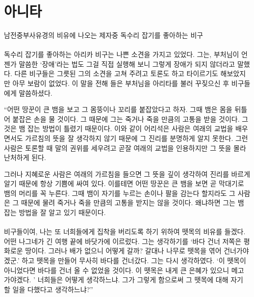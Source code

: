 \documentclass[12pt, a4paper, oneside]{book}
\let\stdsection\section
\renewcommand\section{\newpage\stdsection}
\begin{document}
	\section{ 아니타 }

\paragraph{}
남전중부사유경의 비유에 나오는 제자중 독수리 잡기를 좋아하는 비구

\paragraph{}
독수리 잡기를 좋아하는 아리카 비구는 나쁜 소견을 가지고 있었다.
그는, 부처님이 언젠가 말씀한 ‘장애’라는 법도 그걸 직접 실행해 보니 그렇게 장애가 되지 않더라고 말했다.
다른 비구들은 그릇된 그의 소견을 고쳐 주려고 토론도 하고 타이르기도 해보았지만 아무 보람이 없었다.
이 말을 전해 들은 부처님을 아리타를 불러 꾸짖으신 후 비구들에게 말씀하셨다.

“어떤 땅꾼이 큰 뱀을 보고 그 몸뚱이나 꼬리를 붙잡았다고 하자.
그때 뱀은 몸을 뒤틀어 붙잡은 손을 물 것이다.
그 때문에 그는 죽거나 죽을 만큼의 고통을 받을 것이다.
그것은 뱀 잡는 방법이 틀렸기 때문이다.
이와 같이 어리석은 사람은 여래의 교법을 배우면서도
가르침의 뜻을 잘 생각하지 않기 때문에 그 진리를 분명하게 알지 못한다.
그런 사람은 토론할 때 말의 권위를 세우려고
곧잘 여래의 교법을 인용하지만 그 뜻을 몰라 난처하게 된다.

그러나 지혜로운 사람은 여래의 가르침을 들으면
그 뜻을 깊이 생각하여 진리를 바르게 알기 때문에 항상 기쁨에 싸여 있다.
이를테면 어떤 땅꾼은 큰 뱀을 보면 곧 막대기로 뱀의 머리를 꼭 누른다.
그때 뱀이 자기를 누르는 손이나 팔을 감는다 할지라도
그 사람은 그 때문에 물려 죽거나
죽을 만큼의 고통을 받지는 않을 것이다.
왜냐하면 그는 뱀 잡는 방법을 잘 알고 있기 때문이다. 

\paragraph{}
비구들이여,
나는 또 너희들에게 집착을 버리도록 하기 위하여 뗏목의 비유를 들겠다.
어떤 나그네가 긴 여행 끝에 바닷가에 이르렀다.
그는 생각하기를 ‘바다 건너 저쪽은 평화로운 땅이다.
그러나 배가 없으니 어떻게 갈까?
갈대나 나무로 뗏목을 엮어 건너가야겠군.’ 하고
뗏목을 만들어 무사히 바다를 건너갔다. 그는 다시 생각하였다.
 ‘이 뗏목이 아니었다면 바다를 건너 올 수 없었을 것이다.
이 뗏목은 내게 큰 은혜가 있으니 메고 가야겠다.
’ 너희들은 어떻게 생각하느냐.
그가 그렇게 함으로써 그 뗏목에 대해 자기 할 일을 다했다고 생각하느냐?”
 
\end{document}
